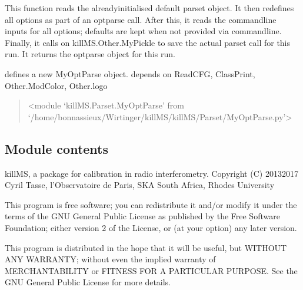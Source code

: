\documentclass[letterpaper,10pt,english]{sphinxmanual}
\begin{document}
\begin{fulllineitems}
\label{\detokenize{api/killMS:killMS.kMS.read_options}}
\pysigstartsignatures
{}
\pysigstopsignatures
\sphinxAtStartPar
This function reads the already\sphinxhyphen{}initialised default parset object.
It then redefines all options as part of an optparse call.
After this, it reads the command\sphinxhyphen{}line inputs for all options; defaults are kept when not provided via commandline.
Finally, it calls on killMS.Other.MyPickle to save the actual parset call for this run.
It returns the optparse object for this run.

\sphinxAtStartPar
defines a new MyOptParse object.
depends on ReadCFG, ClassPrint, Other.ModColor, Other.logo
\begin{quote}\begin{description}
\sphinxAtStartPar
\textless{}module ‘killMS.Parset.MyOptParse’ from ‘/home/bonnassieux/Wirtinger/killMS/killMS/Parset/MyOptParse.py’\textgreater{}

\end{description}\end{quote}

\end{fulllineitems}



\subsection{Module contents}
\label{\detokenize{api/killMS:module-killMS}}\label{\detokenize{api/killMS:module-contents}}
\sphinxAtStartPar
killMS, a package for calibration in radio interferometry.
Copyright (C) 2013\sphinxhyphen{}2017  Cyril Tasse, l’Observatoire de Paris,
SKA South Africa, Rhodes University

\sphinxAtStartPar
This program is free software; you can redistribute it and/or
modify it under the terms of the GNU General Public License
as published by the Free Software Foundation; either version 2
of the License, or (at your option) any later version.

\sphinxAtStartPar
This program is distributed in the hope that it will be useful,
but WITHOUT ANY WARRANTY; without even the implied warranty of
MERCHANTABILITY or FITNESS FOR A PARTICULAR PURPOSE.  See the
GNU General Public License for more details.
\end{document}
